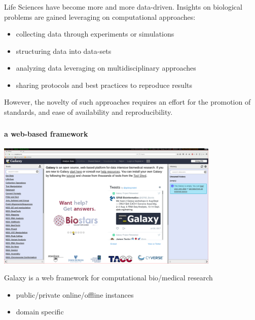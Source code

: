 \documentclass[xcolor=dvipsnames]{beamer}
\newcommand{\cmark}{\ding{51}}%
\newcommand{\xmark}{\ding{55}}%
\begin{document}
\begin{frame}
  \frametitle{\one}
  Life Sciences have become more and more data-driven.\newline\newline
  Insights on biological problems are gained leveraging on computational approaches:
  \vspace{0.2cm}
  \begin{itemize}
    \item collecting data through experiments or simulations \textcolor{ForestGreen}{\cmark}
    \item structuring data into data-sets \textcolor{ForestGreen}{\cmark}
    \item analyzing data leveraging on multidisciplinary approaches \textcolor{ForestGreen}{\cmark}
    \item sharing protocols and best practices to reproduce results \textcolor{BrickRed}{\xmark}
  \end{itemize}
  \vspace{0.2cm}
  However, the novelty of such approaches requires an effort for the promotion of standards, and ease of availability and reproducibility.
\end{frame}



%
%
\begin{frame}
  \frametitle{\two}
  \framesubtitle{a web-based framework}
  \vspace{-0.2cm}
  \begin{center}
    \includegraphics[width=0.80\textwidth]{images/screenshot_usegalaxy}
  \end{center}
  Galaxy is a web framework for computational bio/medical research
  \begin{itemize}
    \item public/private online/offline instances
    \item domain specific
  \end{itemize}
\end{frame}
\end{document}
